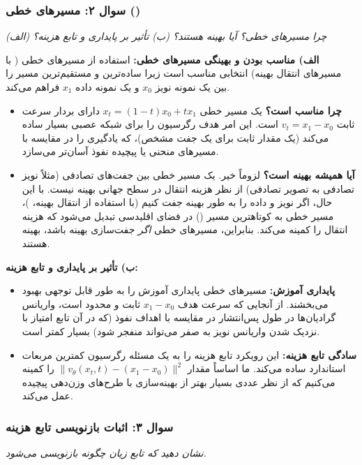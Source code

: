 \subsubsection{سوال ۲: مسیرهای خطی ()}
\textit{(الف) چرا مسیرهای خطی؟ آیا بهینه هستند؟ (ب) تأثیر بر پایداری و تابع هزینه؟}

\begin{solutionbox}
    \textbf{الف) مناسب بودن و بهینگی مسیرهای خطی:}
    استفاده از مسیرهای خطی ( با مسیرهای انتقال بهینه) انتخابی مناسب است زیرا ساده‌ترین و مستقیم‌ترین مسیر را بین یک نمونه نویز $x_0$ و یک نمونه داده $x_1$ فراهم می‌کند.
    \begin{itemize}
        \item \textbf{چرا مناسب است؟} یک مسیر خطی $x_t = (1-t)x_0 + t x_1$ دارای بردار سرعت ثابت $v_t = x_1 - x_0$ است. این امر هدف رگرسیون را برای شبکه عصبی بسیار ساده می‌کند (یک مقدار ثابت برای یک جفت مشخص)، که یادگیری را در مقایسه با مسیرهای منحنی یا پیچیده نفوذ آسان‌تر می‌سازد.
        \item \textbf{آیا همیشه بهینه است؟} لزوماً خیر. یک مسیر خطی بین جفت‌های تصادفی (مثلاً نویز تصادفی به تصویر تصادفی) از نظر هزینه انتقال در سطح جهانی بهینه نیست. با این حال، اگر نویز و داده را به طور بهینه جفت کنیم (با استفاده از انتقال بهینه، )، مسیر خطی به کوتاهترین مسیر () در فضای اقلیدسی تبدیل می‌شود که هزینه انتقال را کمینه می‌کند. بنابراین، مسیرهای خطی \textit{اگر} جفت‌سازی بهینه باشد، بهینه هستند.
    \end{itemize}

    \textbf{ب) تأثیر بر پایداری و تابع هزینه:}
    \begin{itemize}
        \item \textbf{پایداری آموزش:} مسیرهای خطی پایداری آموزش را به طور قابل توجهی بهبود می‌بخشند. از آنجایی که سرعت هدف $x_1 - x_0$ ثابت و محدود است، واریانس گرادیان‌ها در طول پس‌انتشار در مقایسه با اهداف نفوذ (که در آن تابع امتیاز با نزدیک شدن واریانس نویز به صفر می‌تواند منفجر شود) بسیار کمتر است.
        \item \textbf{سادگی تابع هزینه:} این رویکرد تابع هزینه را به یک مسئله رگرسیون کمترین مربعات استاندارد ساده می‌کند. ما اساساً مقدار $\|v_\theta(x_t, t) - (x_1 - x_0)\|^2$ را کمینه می‌کنیم که از نظر عددی بسیار بهتر از بهینه‌سازی  با طرح‌های وزن‌دهی پیچیده عمل می‌کند.
    \end{itemize}
\end{solutionbox}

\subsubsection{سوال ۳: اثبات بازنویسی تابع هزینه}
\textit{نشان دهید که تابع زیان چگونه بازنویسی می‌شود.}

